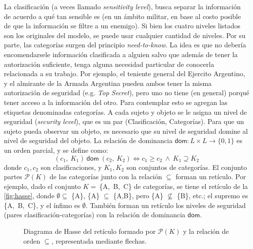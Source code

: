 \documentclass[main.tex]{subfiles}
\begin{document}
La clasificación (a veces llamado \textit{sensitivity level}), busca
separar la información de acuerdo a qué tan sensible es (en un ámbito militar,
en base al costo posible de que la información se filtre a un enemigo). Si bien
los cuatro niveles listados son los originales del modelo, se puede usar
cualquier cantidad de niveles. Por su parte, las categorías surgen del principio \textit{need-to-know}. La idea es que
no debería encomendarsele información clasificada a alguien salvo que
además de tener la autorización suficiente, tenga alguna necesidad particular de conocerla relacionada
a su trabajo. Por ejemplo, el teniente general del Ejercito Argentino, y el
almirante de la Armada Argentina pueden ambos tener la misma autorización de
seguridad (e.g. \textit{Top Secret}), pero uno no tiene (en general) porqué tener acceso a la
información del otro. Para contemplar esto se agregan las etiquetas
denominadas categorías. A cada sujeto y objeto se le asigna un nivel de
seguridad (\textit{security level}), que es un par (Clasificación, Categorías).
Para que un sujeto pueda observar un objeto, es necesario que su nivel de
seguridad domine al nivel de seguridad del objeto. La relación de
dominancia $\mathsf{dom}\colon L\times L \to \{0,1\}$ es un orden parcial, y se define como:
\[ (c_1,~K_1)~\mathsf{dom}~(c_2,~K_2) \Longleftrightarrow c_1 \geq c_2~\wedge~K_1 \supseteq K_2\] 
donde $c_1, c_2$ son clasificaciones, y $K_1, K_2$ son conjuntos de categorías.
El conjunto partes $\mathcal{P}(K)$ de las categorías junto con la
relación $\subseteq$ forman un retículo. Por ejemplo, dado el conjunto
$K=~$\mbox{\{A, B, C\}} de categorías, se tiene el retículo de la \autoref{fig:hasse},
donde $\emptyset \subseteq$ \{A\}, \{A\} $\subseteq$ \{A,B\}, pero \{A\}
$\nsubseteq$ \{B\}, etc.; el supremo es \mbox{\{A, B, C\}}, y el ínfimo es
$\emptyset$. También forman un retículo los niveles de seguridad (pares clasificación-categorías) con la relación de dominancia $\mathsf{dom}$.

\begin{figure}[htp]
  \centering
\begin{minipage}{.46\textwidth}
  \centering
  \caption{\label{fig:hasse} Diagrama de Hasse del retículo formado por $\mathcal{P}(K)$ y la
  relación de orden $\subseteq$, representada mediante flechas.}
\end{minipage}
\end{figure}
\end{document}
